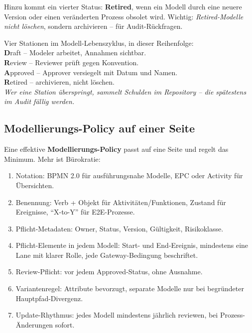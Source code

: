 \documentclass[11pt,a4paper,oneside]{article}
\newcommand{\caveatfontfallback}{\itshape}
\newcommand\caveatfont{\caveatfontfallback}%
\newcommand{\akzent}[1]{{\caveatfont\color{lpAmber}#1}}
\newcommand{\fachbegriff}[1]{\textbf{#1}}
\begin{document}
Hinzu kommt ein vierter Status: \fachbegriff{Retired}, wenn ein Modell durch eine neuere Version oder einen veränderten Prozess obsolet wird. Wichtig: \emph{Retired-Modelle nicht löschen}, sondern archivieren -- für Audit-Rückfragen.

\begin{eselsbox}[Eselsbrücke: \akzent{D-R-A-R}]
Vier Stationen im Modell-Lebenszyklus, in dieser Reihenfolge:\\[2pt]
\textbf{D}raft -- Modeler arbeitet, Annahmen sichtbar.\\
\textbf{R}eview -- Reviewer prüft gegen Konvention.\\
\textbf{A}pproved -- Approver versiegelt mit Datum und Namen.\\
\textbf{R}etired -- archivieren, nicht löschen.\\[2pt]
\emph{Wer eine Station überspringt, sammelt Schulden im Repository -- die spätestens im Audit fällig werden.}
\end{eselsbox}

\subsection{Modellierungs-Policy auf einer Seite}

Eine effektive \fachbegriff{Modellierungs-Policy} passt auf eine Seite und regelt das Minimum. Mehr ist Bürokratie:

\begin{enumerate}
  \item Notation: BPMN 2.0 für ausführungsnahe Modelle, EPC oder Activity für Übersichten.
  \item Benennung: Verb + Objekt für Aktivitäten/Funktionen, Zustand für Ereignisse, ``X-to-Y'' für E2E-Prozesse.
  \item Pflicht-Metadaten: Owner, Status, Version, Gültigkeit, Risikoklasse.
  \item Pflicht-Elemente in jedem Modell: Start- und End-Ereignis, mindestens eine Lane mit klarer Rolle, jede Gateway-Bedingung beschriftet.
  \item Review-Pflicht: vor jedem Approved-Status, ohne Ausnahme.
  \item Variantenregel: Attribute bevorzugt, separate Modelle nur bei begründeter Hauptpfad-Divergenz.
  \item Update-Rhythmus: jedes Modell mindestens jährlich reviewen, bei Prozess-Änderungen sofort.
\end{enumerate}
\end{document}
